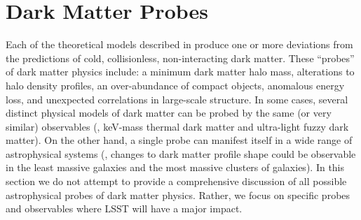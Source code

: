 \chapter{Dark Matter Probes}
\label{sec:probes}
\bigskip

Each of the theoretical models described in  produce one or more deviations from the predictions of cold, collisionless, non-interacting dark matter.
These ``probes'' of dark matter physics include: a minimum dark matter halo mass, alterations to halo density profiles, an over-abundance of compact objects, anomalous energy loss, and unexpected correlations in large-scale structure.
In some cases, several distinct physical models of dark matter can be probed by the same (or very similar) observables (\eg, keV-mass thermal dark matter and ultra-light fuzzy dark matter). 
On the other hand, a single probe can manifest itself in a wide range of astrophysical systems (\eg, changes to dark matter profile shape could be observable in the least massive galaxies and the most massive clusters of galaxies).
In this section we do not attempt to provide a comprehensive discussion of all possible astrophysical probes of dark matter physics.
Rather, we focus on specific probes and observables where LSST will have a major impact.






